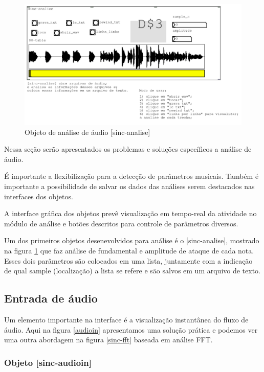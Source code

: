 \documentclass[draft]{ppgmus}
\begin{document}
\begin{figure}
\includegraphics[scale=.6]{sinc-analise}
\caption{Objeto de análise de áudio [sinc-analise]}
\label{sinc-analise}
\end{figure}


Nessa seção serão apresentados os problemas e soluções específicos
a análise de áudio. 

É importante a flexibilização para a detecção de parâmetros musicais.
Também é importante a possibilidade de salvar os dados das análises serem
destacados nas interfaces dos objetos.

A interface gráfica dos objetos prevê visualização em tempo-real
da atividade no módulo de análise e botões descritos para controle
de parâmetros diversos.

Um dos primeiros objetos desenevolvidos para análise é o [sinc-analise],
mostrado na figura \ref{sinc-analise} que faz análise de fundamental e amplitude
de ataque de cada nota. Esses dois parâmetros são colocados em uma lista, juntamente com a indicação
de qual sample (localização) a lista se refere e são salvos em um arquivo de texto.



\subsection{Entrada de áudio}

Um elemento importante na interface é a visualização instantânea
do fluxo de áudio. Aqui na figura \ref{audioin} apresentamos uma solução prática e podemos
ver uma outra abordagem na figura \ref{sinc-fft} baseada em análise FFT.

\subsubsection{Objeto [sinc-audioin]}
\end{document}
